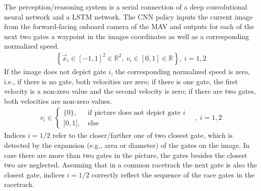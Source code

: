 The perception/reasoning system is a serial connection of a deep convolutional neural network and a LSTM network.
The CNN policy inputs the current image from the forward-facing onboard camera of the MAV
and outputs for each of the next two gates a waypoint in the images coordinates as well as a corresponding normalized speed.
\begin{align}
    \left\{ \vec x_i \in [ -1,1 ]^2 \in \mathbb{R}^2 ,\ v_i \in [0,1] \in \mathbb{R} \right\} ,\ i=1,2
\end{align}
If the image does not depict gate $i$, the corresponding normalized speed is zero, i.e.,
if there is no gate, both velocities are zero;
if there is one gate, the first velocity is a non-zero value and the second velocity is zero;
if there are two gates, both velocities are non-zero values.
\begin{align}
    v_i \in
    \begin{cases}
        \{0\},\ &\text{if picture does not depict gate }i \\
        ]0,1],\ &\text{else} 
    \end{cases}
    \quad,\ i=1,2
\end{align}
Indices $i=1/2$ refer to the closer/farther one of two closest gate, 
which is detected by the expansion (e.g., area or diameter) of the gates on the image.
In case there are more than two gates in the picture, the gates besides the closest two are neglected.
Assuming that in a common racetrack the next gate is also the closest gate,
indices $i=1/2$ correctly reflect the sequence of the race gates in the racetrack.


